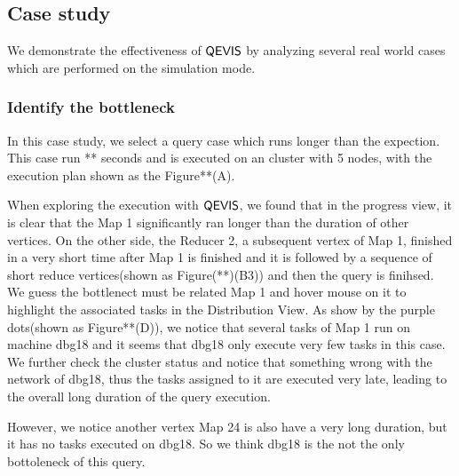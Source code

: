 \subsection{Case study}
We demonstrate the effectiveness of $\mathsf{QEVIS}$ by analyzing several real world cases which are performed on the simulation mode. 

\subsubsection{Identify the bottleneck}
In this case study, we select a query case which runs longer than the expection. This case run ** seconds and is executed on an cluster with 5 nodes, with the execution plan shown as the Figure{**}(A).

When exploring the execution with $\mathsf{QEVIS}$, we found that in the progress view, it is clear that the Map 1 significantly ran longer than the duration of other vertices. On the other side, the Reducer 2, a subsequent vertex of Map 1, finished in a very short time after Map 1 is finished and it is followed by a sequence of short reduce vertices(shown as Figure(**)(B3)) and then the query is finihsed. 
We guess the bottlenect must be related Map 1 and hover mouse on it to highlight the associated tasks in the Distribution View. 
As show by the purple dots(shown as Figure{**}(D)), we notice that several tasks of Map 1 run on machine dbg18 and it seems that dbg18 only execute very few tasks in this case. We further check the cluster status and notice that something wrong with the network of dbg18, thus the tasks assigned to it are executed very late, leading to the overall long duration of the query execution.

However, we notice another vertex Map 24 is also have a very long duration, but it has no tasks executed on dbg18. So we think dbg18 is the not the only bottoleneck of this query.
